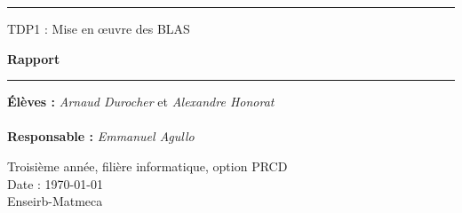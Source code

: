 \thispagestyle{empty}


%
\hrule
\begin{flushleft}
\Huge{TDP1 : Mise en \oe uvre des BLAS}\\
\end{flushleft}
\begin{flushright}
\huge\textbf{Rapport}\\
\end{flushright}
\hrule

\vspace{80pt}
\noindent\textbf{Élèves :}
\emph{Arnaud Durocher} et \emph{Alexandre Honorat}\\
\\
\noindent\textbf{Responsable :}
\emph{Emmanuel Agullo}\\


\vspace{60pt}
\normalsize
\begin{center}
  Troisième année, filière informatique, option PRCD\\
  Date : \today\\
  Enseirb-Matmeca
\end{center}
\vspace{50pt}
